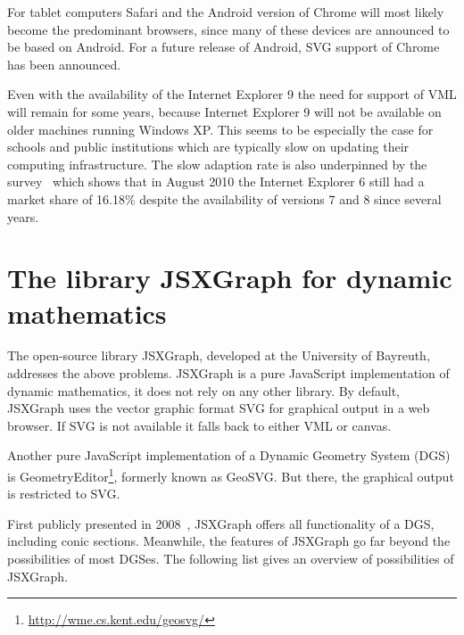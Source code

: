 \documentclass[12pt,a4paper]{article}%
\begin{document}
For tablet computers Safari and the Android version of Chrome will most likely become the
predominant browsers, since many of these devices are announced to be based on Android.
For a future release of Android, SVG support of Chrome has been announced.

Even with the availability of the Internet Explorer 9 the need for support of
VML will remain for some years, because Internet Explorer 9 will not be available 
on older machines running Windows XP.
This seems to be especially the case for schools and public institutions which are
typically slow on updating their computing infrastructure. 
The slow adaption rate is also underpinned by the survey~\cite{netapplications} which
shows that in August 2010 the Internet Explorer 6 still had a market share of 16.18\%
despite the availability of versions 7 and 8 since several years.


\section{The library JSXGraph for dynamic mathematics}
The open-source library JSXGraph, developed at the University of Bayreuth, 
addresses the above problems.
JSXGraph is a pure JavaScript implementation of dynamic mathematics, it does not rely on any other 
library. By default, JSXGraph uses the vector graphic format SVG
for graphical output in a web browser. If SVG is not available it falls
back to either VML or canvas.

Another pure JavaScript implementation of a Dynamic Geometry System (DGS) is
GeometryEditor\footnote{\href{http://wme.cs.kent.edu/geosvg/}{http://wme.cs.kent.edu/geosvg/}}, 
formerly known as GeoSVG. But there, the graphical output is restricted to SVG.

First publicly presented in 2008~\cite{ehmann2008}, JSXGraph offers all 
functionality of a DGS, including conic sections.
Meanwhile, the features of JSXGraph go far beyond the possibilities
of most DGSes.
The following list gives an overview of possibilities of JSXGraph.
\end{document}
